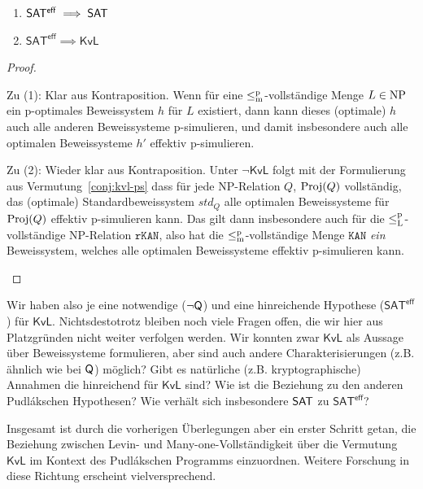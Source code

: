 \begin{theorem}\label{thm:sateff-generalizes-sat}
    \begin{enumerate}
        \item $\mathsf{SAT^{eff}}\implies \mathsf{SAT}$
        \item $\mathsf{SAT^{eff}}\implies \mathsf{KvL}$
    \end{enumerate}
\end{theorem}
\begin{proof}
\begin{prooflist}
\item Zu (1): Klar aus Kontraposition. Wenn für eine $\leq_\mathrm{m}^\mathrm{p}$-vollständige Menge $L\in\mathrm{NP}$ ein p-optimales Beweissystem $h$ für $L$ existiert, dann kann dieses (optimale) $h$ auch alle anderen Beweissysteme p-simulieren, und damit insbesondere auch alle optimalen Beweissysteme $h'$ effektiv p-simulieren.

\item Zu (2): Wieder klar aus Kontraposition. Unter $\neg\mathsf{KvL}$ folgt mit der Formulierung aus Vermutung~\ref{conj:kvl-ps} dass für jede NP-Relation $Q$, $\operatorname{Proj}(Q)$ vollständig, das (optimale) Standardbeweissystem $\mathit{std}_Q$ alle optimalen Beweissysteme für $\operatorname{Proj}(Q)$ effektiv p-simulieren kann. Das gilt dann insbesondere auch für die $\leq_\mathrm{L}^\mathrm{p}$-vollständige NP-Relation $\mathtt{rKAN}$, also hat die $\leq_\mathrm{m}^\mathrm{p}$-vollständige Menge $\mathtt{KAN}$ \emph{ein} Beweissystem, welches alle optimalen Beweissysteme effektiv p-simulieren kann.
\end{prooflist}
\end{proof}

Wir haben also je eine notwendige ($\neg\mathsf{Q}$) und eine hinreichende Hypothese ($\mathsf{SAT^{eff}}$) für $\mathsf{KvL}$. 
Nichtsdestotrotz bleiben noch viele Fragen offen, die wir hier aus Platzgründen nicht weiter verfolgen werden. 
Wir konnten zwar $\mathsf{KvL}$ als Aussage über Beweissysteme formulieren, aber sind auch andere Charakterisierungen (z.B. ähnlich wie bei $\mathsf{Q}$) möglich?
Gibt es natürliche (z.B. kryptographische) Annahmen die hinreichend für $\mathsf{KvL}$ sind? Wie ist die Beziehung zu den anderen Pudlákschen Hypothesen? Wie verhält sich insbesondere $\mathsf{SAT}$ zu $\mathsf{SAT^{eff}}$? 

Insgesamt ist durch die vorherigen Überlegungen aber ein erster Schritt getan, die Beziehung zwischen Levin- und Many-one-Vollständigkeit über die Vermutung $\mathsf{KvL}$ im Kontext des Pudlákschen Programms einzuordnen.
Weitere Forschung in diese Richtung erscheint vielversprechend.

